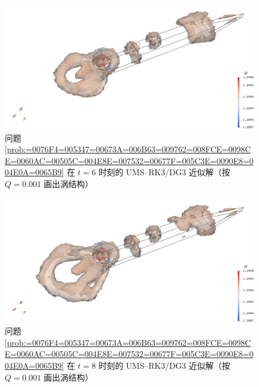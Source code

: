 \begin{figure}[h!]
\begin{centering}
\includegraphics[width=1\textwidth,height=0.28\textheight,keepaspectratio]{figures/ship/x=0/Frame60_Q}
\par\end{centering}
\caption{\label{fig:ship_x=00003D0_a=00003D0_t=00003D6_Q}问题 \ref{prob:=0076F4=005347=00673A=006B63=009762=008FCE=0098CE=0060AC=00505C=004E8E=007532=00677F=005C3E=0090E8=004E0A=0065B9}
在 $t=6$ 时刻的 UMS–RK3/DG3 近似解（按 $Q=0.001$ 画出涡结构）}
\end{figure}

\begin{figure}[h!]
\begin{centering}
\includegraphics[width=1\textwidth,height=0.28\textheight,keepaspectratio]{figures/ship/x=0/Frame80_Q}
\par\end{centering}
\caption{\label{fig:ship_x=00003D0_a=00003D0_t=00003D8_Q}问题 \ref{prob:=0076F4=005347=00673A=006B63=009762=008FCE=0098CE=0060AC=00505C=004E8E=007532=00677F=005C3E=0090E8=004E0A=0065B9}
在 $t=8$ 时刻的 UMS–RK3/DG3 近似解（按 $Q=0.001$ 画出涡结构）}
\end{figure}

